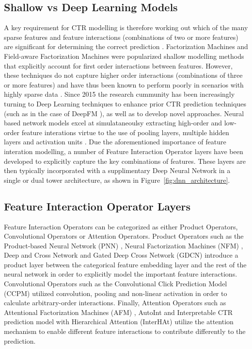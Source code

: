 \documentclass{mldsmsc}
\begin{document}
\subsection{Shallow vs Deep Learning Models}


A key requirement for CTR modelling is therefore working out which of the many sparse features and feature 
interactions (combinations of two or more features) are significant for determining the correct prediction 
\citep{RefWorks:gu2021ad}. Factorization Machines \citep{RefWorks:rendle2010factorization} and Field-aware Factorization Machines \citep{RefWorks:juan2016field-aware}
were popularized shallow modelling methods that explicitly account for first order interactions between features. 
However, these techniques do not capture higher order interactions (combinations of three or more features) and 
have thus been known to perform poorly in scenarios with highly sparse data \citep{RefWorks:zhang2021deep}. Since 2015 the 
research cummunity has been increasingly turning to Deep Learning techniques to enhance prior CTR prediction 
techniques (such as in the case of DeepFM \citep{RefWorks:guo2017deepfm:}), as well as to develop novel approaches. Neural based 
network models excel at simulataneoulsy extracting high-order and low-order feature interations virtue to the use 
of pooling layers, multiple hidden layers and activation units \cite{RefWorks:gu2021ad}. Due the aforementioned importance of 
feature interation modelling, a number of Feature Interaction Operator layers have been developed to explicitly 
capture the key combinations of features. These layers are then typically incorporated with a supplimentary Deep 
Neural Network in a single or dual tower architecture, as shown in Figure~\ref{fig:dnn_architecture}.

\subsection{Feature Interaction Operator Layers}

Feature Interaction Operators can be categorized as either Product Operators, Convolutional Operators or 
Attention Operators. Product Operators such as the Product-based Neural Network (PNN) \citep{RefWorks:qu2016product-based}, 
Neural Factorization Machines (NFM) \citep{RefWorks:he2017neural}, Deep and Cross Network \citep{RefWorks:wang2017deep} and 
Gated Deep Cross Network (GDCN) \citep{RefWorks:wang2023deeper} introduce a product layer between the categorical 
feature embedding layer and the rest of the neural network in order to explicitly model the important feature 
interactions. Convolutional Operators such as the Convolutional Click Prediction Model (CCPM) \citep{RefWorks:liu2015convolutional} 
utilized convolution, pooling and non-linear activation in order to calculate arbitrary-order interactions. 
Finally, Attention Operators such as Attentional Factorization Machines (AFM) \citep{RefWorks:xiao2017attentional}, AutoInt 
\cite{RefWorks:song2019autoint} and Interpretable CTR prediction model with Hierarchical Attention (InterHAt) \citep{RefWorks:li2020interpretable}
utilize the attention mechanism to enable different feature interactions to contribute differently to the 
prediction.
\end{document}
